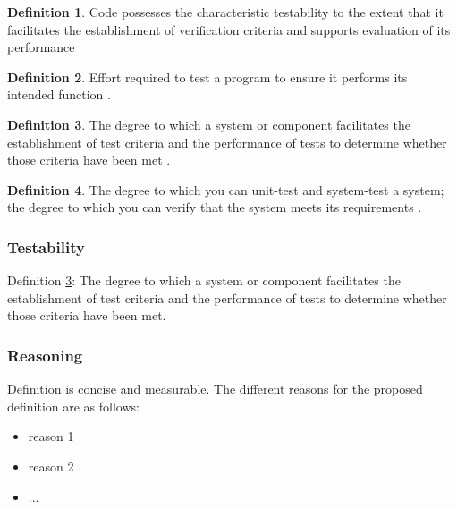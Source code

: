 \documentclass[letterpaper, cleveref]{lipics-v2019}
\theoremstyle{definition}
\newtheorem{defn}{Definition}
\begin{document}
\begin{defn}
	Code possesses the characteristic testability to the extent that it
  facilitates the establishment of verification criteria and supports
  evaluation of its performance \citep{boehm1976quantitative}
\end{defn}

\begin{defn}
	Effort required to test a program to ensure it performs
	its intended function \citep{McCallEtAl1977}.
\end{defn}

\begin{defn} \label{Defn_Testability}
	 The degree to which a system or component facilitates the establishment of
	 test criteria and the performance of tests to determine whether those
	 criteria have been met \citep{IEEEStdGlossarySET1990}.
\end{defn}

\begin{defn}
	The degree to which you can unit-test and system-test a system; the degree
  to which you can verify that the system meets its requirements
  \citep{mcconnell2004code}.
\end{defn}

\begin{mybox}
\subsubsection*{Testability}
Definition \ref{Defn_Testability}: The degree to which a system or component
 facilitates the establishment of test criteria and the performance of tests
 to determine whether those criteria have been met.
\end{mybox}

\subsubsection*{Reasoning}

Definition is concise and measurable.   The different reasons for the proposed
definition are as follows:

\begin{itemize}
  \item reason 1
  \item reason 2
  \item ...
\end{itemize}

\end{document}
